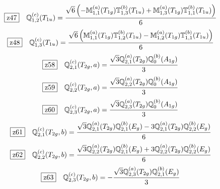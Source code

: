 \documentclass[fleqn,10pt,landscape]{jsarticle}
\begin{document}
\begin{dmath*}
\hspace*{3mm}\fbox{z47}\quad \mathbb{Q}_{1,2}^{(c)}(T_{1u})=\frac{\sqrt{6} \left(- \mathbb{M}_{1,1}^{(a)}(T_{1g}) \mathbb{T}_{1,3}^{(b)}(T_{1u}) + \mathbb{M}_{1,3}^{(a)}(T_{1g}) \mathbb{T}_{1,1}^{(b)}(T_{1u})\right)}{6}
\end{dmath*}
\begin{dmath*}
\hspace*{3mm}\fbox{z48}\quad \mathbb{Q}_{1,3}^{(c)}(T_{1u})=\frac{\sqrt{6} \left(\mathbb{M}_{1,1}^{(a)}(T_{1g}) \mathbb{T}_{1,2}^{(b)}(T_{1u}) - \mathbb{M}_{1,2}^{(a)}(T_{1g}) \mathbb{T}_{1,1}^{(b)}(T_{1u})\right)}{6}
\end{dmath*}
\begin{dmath*}
\hspace*{3mm}\fbox{z58}\quad \mathbb{Q}_{2,1}^{(c)}(T_{2g},a)=\frac{\sqrt{3} \mathbb{Q}_{2,1}^{(a)}(T_{2g}) \mathbb{Q}_{0}^{(b)}(A_{1g})}{3}
\end{dmath*}
\begin{dmath*}
\hspace*{3mm}\fbox{z59}\quad \mathbb{Q}_{2,2}^{(c)}(T_{2g},a)=\frac{\sqrt{3} \mathbb{Q}_{2,2}^{(a)}(T_{2g}) \mathbb{Q}_{0}^{(b)}(A_{1g})}{3}
\end{dmath*}
\begin{dmath*}
\hspace*{3mm}\fbox{z60}\quad \mathbb{Q}_{2,3}^{(c)}(T_{2g},a)=\frac{\sqrt{3} \mathbb{Q}_{2,3}^{(a)}(T_{2g}) \mathbb{Q}_{0}^{(b)}(A_{1g})}{3}
\end{dmath*}
\begin{dmath*}
\hspace*{3mm}\fbox{z61}\quad \mathbb{Q}_{2,1}^{(c)}(T_{2g},b)=\frac{\sqrt{3} \mathbb{Q}_{2,1}^{(a)}(T_{2g}) \mathbb{Q}_{2,1}^{(b)}(E_{g}) - 3 \mathbb{Q}_{2,1}^{(a)}(T_{2g}) \mathbb{Q}_{2,2}^{(b)}(E_{g})}{6}
\end{dmath*}
\begin{dmath*}
\hspace*{3mm}\fbox{z62}\quad \mathbb{Q}_{2,2}^{(c)}(T_{2g},b)=\frac{\sqrt{3} \mathbb{Q}_{2,2}^{(a)}(T_{2g}) \mathbb{Q}_{2,1}^{(b)}(E_{g}) + 3 \mathbb{Q}_{2,2}^{(a)}(T_{2g}) \mathbb{Q}_{2,2}^{(b)}(E_{g})}{6}
\end{dmath*}
\begin{dmath*}
\hspace*{3mm}\fbox{z63}\quad \mathbb{Q}_{2,3}^{(c)}(T_{2g},b)=- \frac{\sqrt{3} \mathbb{Q}_{2,3}^{(a)}(T_{2g}) \mathbb{Q}_{2,1}^{(b)}(E_{g})}{3}
\end{dmath*}
\end{document}
